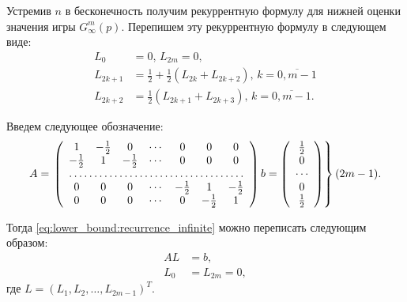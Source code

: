 Устремив $ n $ в бесконечность получим рекуррентную формулу для нижней оценки значения игры $ G_\infty^m(p) $. Перепишем эту рекуррентную формулу в следующем виде:
\begin{equation}
\label{eq:lower_bound:recurrence_infinite}
\begin{aligned}
L_0 &= 0,\, L_{2m} = 0, \\
L_{2k + 1} &= \frac{1}{2} + \frac{1}{2} (L_{2k} + L_{2k + 2}), \, 
    k = \overline{0,m-1}\\
L_{2k + 2} &= \frac{1}{2} (L_{2k + 1} + L_{2k + 3}), \, 
    k = \overline{0,m-1}.
\end{aligned}
\end{equation}

Введем следующее обозначение:
\begin{equation}
A = \left.
\left(\begin{array}{ccccccc}
    1 & -\frac{1}{2} & 0 & \cdots & 0 & 0 & 0 \\
    -\frac{1}{2} & 1 & -\frac{1}{2} & \cdots & 0 & 0 & 0 \\
    \hdotsfor{7} \\
    0 & 0 & 0 & \cdots & -\frac{1}{2} & 1 & -\frac{1}{2} \\
    0 & 0 & 0 & \cdots & 0 & -\frac{1}{2} & 1 \\
\end{array}\right)
b = \left(\begin{array}{c}
\frac{1}{2} \\
0\\
\cdots\\
0 \\
\frac{1}{2}
\end{array}\right)
\right\} (2m - 1).
\end{equation}


Тогда \eqref{eq:lower_bound:recurrence_infinite} можно переписать следующим образом:
\[
\begin{aligned}
AL &= b, \\
L_0 &= L_{2m} = 0,
\end{aligned}
\]
где $ L = (L_1, L_2, \ldots, L_{2m-1})^T $.


